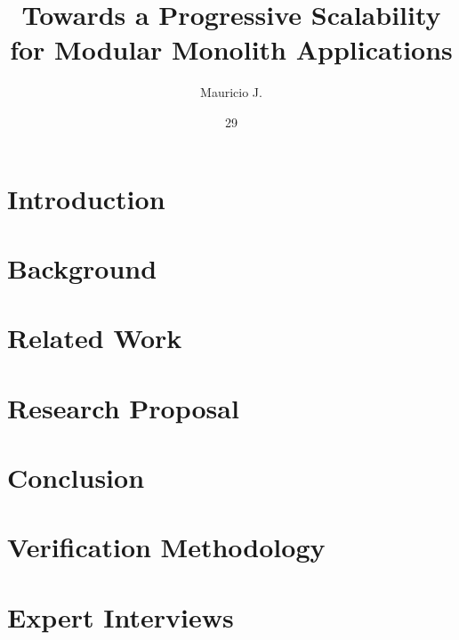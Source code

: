 \documentclass[msc, eng]{ita}    %
\author{Mauricio J.}{Carvalho dos Santos}
\title{Towards a Progressive Scalability for Modular Monolith Applications}
\date{29}{JUNE}{2026}
\begin{document}


\mainmatter

\chapter{Introduction}


\chapter{Background}


\chapter{Related Work}


\chapter{Research Proposal}


\chapter{Conclusion}


\renewcommand\bibname{\itareferencesnamebabel} %
\printbibliography

\appendix
\chapter{Verification Methodology}
\label{ape:methodology}


\chapter{Expert Interviews}
\label{ape:interviews}
















\end{document}
